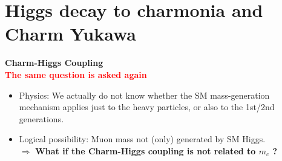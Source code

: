 \documentclass[aspectratio=169]{beamer}
\begin{document}
\section{Higgs decay to charmonia and Charm Yukawa} 

\begin{frame}
	\vspace{6mm}
	\centering
	\textcolor{PittRoyal}{{\Huge \bf Charm-Higgs Coupling }}\\
	\vspace{5mm}
	\textcolor{red}{\bf \Large The same question is asked again }
	\begin{itemize}
		\item Physics: We actually do not know whether the SM mass-generation mechanism
		applies just to the heavy particles, or also to the 1st/2nd generations.
		\item Logical possibility: Muon mass not (only) generated by SM Higgs.\\
		$\Rightarrow$ \textcolor{PittRoyal}{\bf What if the Charm-Higgs coupling is not related to $m_c$ ?}
	\end{itemize}
\end{frame}
\end{document}

